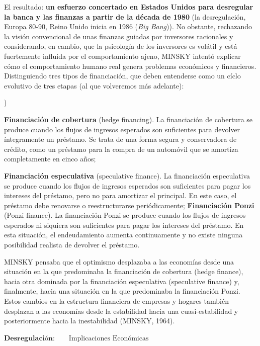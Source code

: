 \documentclass[10pt,a4paper]{article}
\newcounter{alphaitem}
\newenvironment{la}
      {\begin{list}{\alph{alphaitem})}{%
          \usecounter{alphaitem}%
          \setlength{\leftmargin}{1cm}%
          \setlength{\parskip}{3pt}%
          \setlength{\itemsep}{0pt}%
          \setlength{\parsep}{0pt}%
      }}
      {\end{list}}
\begin{document}
El resultado: \textbf{un esfuerzo concertado en Estados Unidos para desregular la banca y las finanzas a partir de la década de 1980} (la desregulación, Europa 80-90, Reino Unido inicia en 1986 (\textit{Big Bang})). No obstante, rechazando la visión convencional de unas finanzas guiadas por inversores racionales y considerando, en cambio, que la psicología de los inversores es volátil y está fuertemente influida por el comportamiento ajeno, MINSKY intentó explicar cómo el comportamiento humano real genera problemas económicos y financieros. Distinguiendo tres tipos de financiación, que deben entenderse como un cíclo evolutivo de tres etapas (al que volveremos más adelante):
\begin{la}
    \item \textbf{Financiación de cobertura} (hedge financing). La financiación de cobertura se produce cuando los flujos de ingresos esperados son suficientes para devolver íntegramente un préstamo. Se trata de una forma segura y conservadora de crédito, como un préstamo para la compra de un automóvil que se amortiza completamente en cinco años;
    \item \textbf{Financiación especulativa} (speculative finance). La financiación especulativa se produce cuando los flujos de ingresos esperados son suficientes para pagar los intereses del préstamo, pero no para amortizar el principal. En este caso, el préstamo debe renovarse o reestructurarse periódicamente;
    \textbf{Financiación Ponzi} (Ponzi finance). La financiación Ponzi se produce cuando los flujos de ingresos esperados ni siquiera son suficientes para pagar los intereses del préstamo. En esta situación, el endeudamiento aumenta continuamente y no existe ninguna posibilidad realista de devolver el préstamo.
\end{la}

MINSKY pensaba que el optimismo desplazaba a las economías desde una situación en la que predominaba la financiación de cobertura (hedge finance), hacia otra dominada por la financiación especulativa (speculative finance) y, finalmente, hacia una situación en la que predominaba la financiación Ponzi. Estos cambios en la estructura financiera de empresas y hogares también desplazan a las economías desde la estabilidad hacia una cuasi-estabilidad y posteriormente hacia la inestabilidad (MINSKY, 1964). 

$\mathbf{\textbf{Desregulación}:}\qquad \text{Implicaciones Económicas}$
\end{document}
